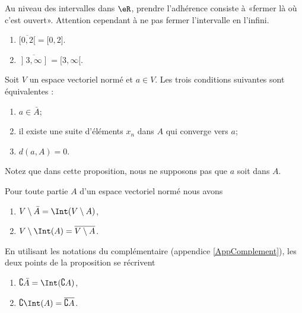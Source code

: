 \begin{example}
	Au niveau des intervalles dans $\eR$, prendre l'adhérence consiste à «fermer là où c'est ouvert». Attention cependant à ne pas fermer l'intervalle en l'infini.
	\begin{enumerate}
		\item
			$\overline{ \mathopen[ 0 , 2 [ }=\mathopen[ 0 , 2 \mathclose]$.
		\item
			$\overline{ \mathopen] 3 , \infty \mathopen] }=\mathopen[ 3 , \infty [$.
	\end{enumerate}
\end{example}

\begin{proposition}
	Soit $V$ un espace vectoriel normé et $a\in V$. Les trois conditions suivantes sont équivalentes :
	\begin{enumerate}
		\item
			$a\in\bar A$;
		\item
			il existe une suite d'éléments $x_n$ dans $A$ qui converge vers $a$;
		\item
			$d(a,A)=0$.
	\end{enumerate}
\end{proposition}
Notez que dans cette proposition, nous ne supposons pas que $a$ soit dans $A$.

\begin{proposition}		\label{PropComleIntBar}
	Pour toute partie $A$ d'un espace vectoriel normé nous avons
	\begin{enumerate}
		\item
			$V\setminus\bar A=\Int(V\setminus A)$,
		\item
			$V\setminus\Int(A)=\overline{ V\setminus A }$.
	\end{enumerate}
\end{proposition}

En utilisant les notations du complémentaire (appendice \ref{AppComplement}), les deux points de la proposition se récrivent
\begin{enumerate}
	\item
		$\complement \bar A=\Int(\complement A)$,
	\item\label{ItemLemPropComplementiv}
		$\complement\Int(A)=\overline{ \complement A }$.
\end{enumerate}

